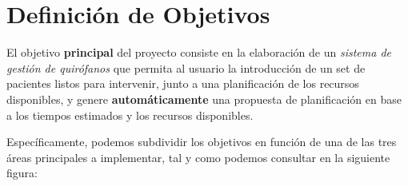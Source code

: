
\section{Definición de Objetivos}

El objetivo \textbf{principal} del proyecto consiste en la elaboración de un \textit{sistema de gestión de quirófanos} que permita al usuario la introducción de un set de pacientes listos para intervenir, junto a una planificación de los recursos disponibles, y genere \textbf{automáticamente} una propuesta de planificación en base a los tiempos estimados y los recursos disponibles.

Específicamente, podemos subdividir los objetivos en función de una de las tres áreas principales a implementar, tal y como podemos consultar en la siguiente figura:


\renewcommand{\theenumii}{\roman{enumi}}

